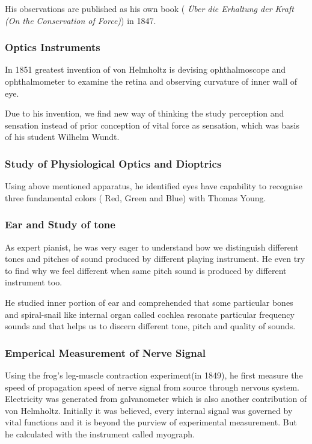\documentclass[11pt]{article}
\begin{document}
His observations are published as his own book (\textit{ Über die Erhaltung der Kraft (On the Conservation of Force)}) in 1847. 

\subsubsection{Optics Instruments}
In 1851 greatest invention of von Helmholtz is devising ophthalmoscope and ophthalmometer to examine the retina and observing curvature of inner wall of eye. 

Due to his invention, we find new way of thinking the study perception and sensation instead of prior conception of vital force as sensation, which was basis of his student Wilhelm Wundt.

\subsubsection{Study of Physiological Optics and Dioptrics}
Using above mentioned apparatus, he identified eyes have capability to recognise three fundamental colors ( Red, Green and  Blue) with Thomas Young.

\subsubsection{Ear and Study of tone}
As expert pianist, he was very eager to understand how we distinguish different tones and pitches of sound produced by different playing instrument. He even try to find why we feel different when same pitch sound is produced by different instrument too.

He studied inner portion of ear and comprehended that some particular bones and spiral-snail like internal organ called cochlea resonate particular frequency sounds and that helps us to discern different tone, pitch and quality of sounds.



\subsubsection{Emperical Measurement of Nerve Signal}
Using the frog's leg-muscle contraction experiment(in 1849), he first measure the speed of propagation speed of nerve signal from source through nervous system. Electricity was generated from galvanometer which is also another contribution of von Helmholtz.
Initially it was believed, every internal signal was governed by vital functions and it is beyond the purview of experimental measurement. But he calculated with the instrument called myograph.
\end{document}
